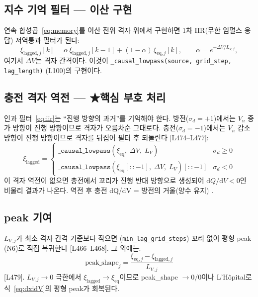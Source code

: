 \documentclass[11pt,a4paper]{article}
\newcommand{\dd}{\mathrm{d}}
\newcommand{\eq}{\mathrm{eq}}
\begin{document}
\subsection{지수 기억 필터 — 이산 구현}

연속 합성곱~\eqref{eq:memory}를 이산 전위 격자 위에서 구현하면
1차 IIR(무한 임펄스 응답) 저역통과 필터가 된다:
\begin{equation}
  \xi_{\mathrm{lagged},j}[k] = \alpha\,\xi_{\mathrm{lagged},j}[k-1]
  + (1-\alpha)\,\xi_{\eq,j}[k],\qquad
  \alpha = e^{-\Delta V/L_{V,j}},
  \label{eq:iir}
\end{equation}
여기서 $\Delta V$는 격자 간격이다.
이것이 \texttt{\_causal\_lowpass(source, grid\_step, lag\_length)} (L100)의 구현이다.

\subsection{충전 격자 역전 — ★핵심 부호 처리}

인과 필터~\eqref{eq:iir}는 ``진행 방향의 과거''를 기억해야 한다.
방전($\sigma_d=+1$)에서는 $V_n$ 증가 방향이 진행 방향이므로
격자가 오름차순 그대로다.
충전($\sigma_d=-1$)에서는 $V_n$ 감소 방향이 진행 방향이므로
격자를 뒤집어 필터 후 되돌린다 [L474--L477]:
\begin{equation}
  \xi_{\mathrm{lagged}} = \begin{cases}
    \texttt{\_causal\_lowpass}(\xi_{\eq},\;\Delta V,\;L_V) & \sigma_d \ge 0\\
    \texttt{\_causal\_lowpass}(\xi_{\eq}[::-1],\;\Delta V,\;L_V)[::-1] & \sigma_d < 0
  \end{cases}
  \label{eq:reverse}
\end{equation}
이 격자 역전이 없으면 충전에서 꼬리가 진행 반대 방향으로 생성되어
$\dd Q/\dd V < 0$인 비물리 결과가 나온다.
역전 후 충전 dQ/dV = 방전의 거울(양수 유지) \checkmark.

\subsection{peak 기여}

$L_{V,j}$가 최소 격자 간격 기준보다 작으면 (\texttt{min\_lag\_grid\_steps}) 꼬리 없이
평형 peak (N6)로 직접 복귀한다 [L466--L468]. 그 외에는:
\begin{equation}
  \text{peak\_shape}_j = \frac{\xi_{\eq,j} - \xi_{\mathrm{lagged},j}}{L_{V,j}}
  \label{eq:peakshape}
\end{equation}
[L479]. $L_{V,j}\to0$ 극한에서 $\xi_{\mathrm{lagged}} \to \xi_{\eq}$이므로
peak\_shape $\to 0/0$이나 L'Hôpital로 식~\eqref{eq:dxidV}의 평형 peak가 회복된다.
\end{document}
